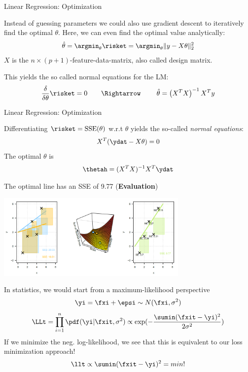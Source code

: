 \begin{frame}{Linear Regression: Optimization}

Instead of guessing parameters we could also use gradient descent to
iteratively find the optimal \(\theta\). Here, we can even find the
optimal value analytically: \[
\hat{\theta} = \argmin_{\theta} \risket = \argmin_{\theta} \|y - X\theta\|^2_2
\] \(X\) is the \(n \times (p+1)\)-feature-data-matrix, also called
design matrix.

This yields the so called normal equations for the LM: \[
\frac{\delta}{\delta\theta} \risket = 0 \qquad \Rightarrow\ \qquad \hat{\theta} = \left(X^T X\right)^{-1}X^Ty
\]

\end{frame}



\begin{vbframe}{Linear Regression: Optimization}

Differentiating $\risket = \operatorname{SSE}(\theta)$ w.r.t $\theta$ yields the so-called \emph{normal equations}:
$$
X^T(\ydat - X\theta) = 0
$$
The optimal $\theta$ is
$$
\thetah = (X^T X)^{-1} X^T\ydat
$$

\framebreak

The optimal line has an SSE of 9.77 (\textbf{Evaluation})

\begin{center}
\includegraphics[width=0.7\textwidth]{plots/lin-reg-optim03.png}
\end{center}

\framebreak

In statistics, we would start from a maximum-likelihood perspective
$$
\yi = \fxi + \epsi \sim N(\fxi, \sigma^2)
$$
$$
\LLt = \prod_{i=1}^n \pdf(\yi | \fxit, \sigma^2) \propto \exp(-\frac{\sumin (\fxit - \yi)^2}{2\sigma^2})
$$
If we minimize the neg. log-likelihood, we see that this is equivalent to our
loss minimization approach!
$$
\llt \propto \sumin (\fxit - \yi)^2  = min!
$$
\end{vbframe}


